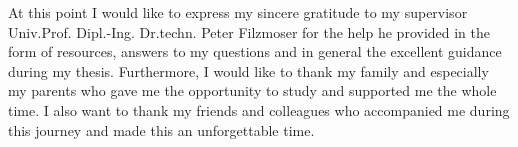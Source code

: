 At this point I would like to express my sincere gratitude to my supervisor Univ.Prof. Dipl.-Ing. Dr.techn. Peter Filzmoser for the help he provided in the form of resources, answers to my questions and in general the excellent guidance during my thesis. Furthermore, I would like to thank my family and especially my parents who gave me the opportunity to study and supported me the whole time. I also want to thank my friends and colleagues who accompanied me during this journey and made this an unforgettable time. 